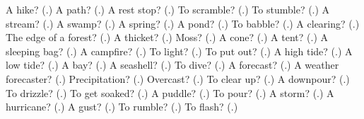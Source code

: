 \begin{tcolorbox}[breakable,colback=teal!4,colframe=teal!35!black,title={Before you move on}]
A hike? (\textbf{}.) A path? (\textbf{}.) A rest stop? (\textbf{}.) To scramble? (\textbf{}.) To stumble? (\textbf{}.) A stream? (\textbf{}.) A swamp? (\textbf{}.) A spring? (\textbf{}.) A pond? (\textbf{}.) To babble? (\textbf{}.) A clearing? (\textbf{}.) The edge of a forest? (\textbf{}.) A thicket? (\textbf{}.) Moss? (\textbf{}.) A cone? (\textbf{}.) A tent? (\textbf{}.) A sleeping bag? (\textbf{}.) A campfire? (\textbf{}.) To light? (\textbf{}.) To put out? (\textbf{}.) A high tide? (\textbf{}.) A low tide? (\textbf{}.) A bay? (\textbf{}.) A seashell? (\textbf{}.) To dive? (\textbf{}.) A forecast? (\textbf{}.) A weather forecaster? (\textbf{}.) Precipitation? (\textbf{}.) Overcast? (\textbf{}.) To clear up? (\textbf{}.) A downpour? (\textbf{}.) To drizzle? (\textbf{}.) To get soaked? (\textbf{}.) A puddle? (\textbf{}.) To pour? (\textbf{}.) A storm? (\textbf{}.) A hurricane? (\textbf{}.) A gust? (\textbf{}.) To rumble? (\textbf{}.) To flash? (\textbf{}.)
\end{tcolorbox}
